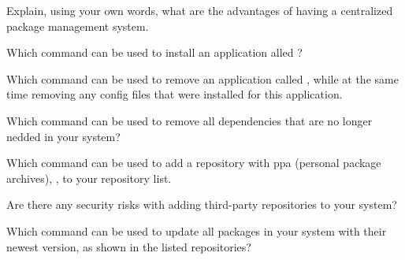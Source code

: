 \begin{exercises}
  \item Explain, using your own words, what are the advantages of having a centralized package management system.
  \item Which command can be used to install an application  alled ?
  \item Which command can be used to remove an application called , while at the same time removing any config files that were installed for this application.
  \item Which command can be used to remove all dependencies that are no longer nedded in your system?
  \item Which command can be used to add a repository with ppa (personal package archives), , to your repository list.
  \item Are there any security risks with adding third-party repositories to your system? 
  \item Which command can be used to update all packages in your system with their newest version, as shown in the listed repositories?
\end{exercises}